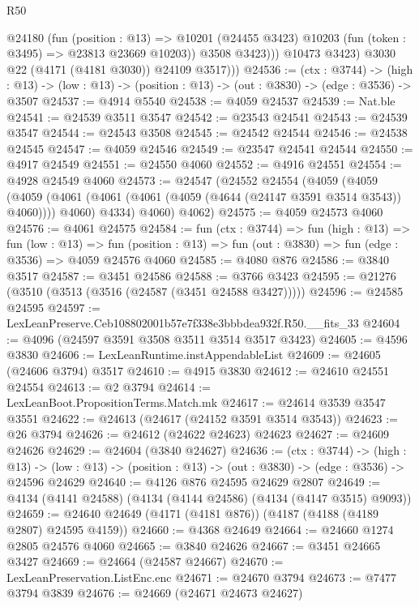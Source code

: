 \begin{lexlean}{R50}
\begin{coremodule}
                @24180
                  (fun (position : @13) =>
                  @10201 (@24455 @3423) @10203 (fun (token : @3495) => @23813 @23669 @10203))
                  @3508
                  @3423)))
            @10473
            @3423)
          @3030
          @22
          (@4171 (@4181 @3030))
          @24109
          @3517)))
@24536 := (ctx : @3744) ->
  (high : @13) -> (low : @13) -> (position : @13) -> (out : @3830) -> (edge : @3536) -> @3507
@24537 := @4914 @5540
@24538 := @4059 @24537
@24539 := Nat.ble
@24541 := @24539 @3511 @3547
@24542 := @23543 @24541
@24543 := @24539 @3547
@24544 := @24543 @3508
@24545 := @24542 @24544
@24546 := @24538 @24545
@24547 := @4059 @24546
@24549 := @23547 @24541 @24544
@24550 := @4917 @24549
@24551 := @24550 @4060
@24552 := @4916 @24551
@24554 := @4928 @24549 @4060
@24573 := @24547
    (@24552
      @24554
      (@4059
        (@4059
          (@4059 (@4061 (@4061 (@4061 (@4059 (@4644 (@24147 @3591 @3514 @3543)) @4060)))) @4060)
          @4334)
        @4060)
      @4062)
@24575 := @4059 @24573 @4060
@24576 := @4061 @24575
@24584 := fun (ctx : @3744) =>
  fun (high : @13) =>
  fun (low : @13) =>
  fun (position : @13) => fun (out : @3830) => fun (edge : @3536) => @4059 @24576 @4060
@24585 := @4080 @876
@24586 := @3840 @3517
@24587 := @3451 @24586
@24588 := @3766 @3423
@24595 := @21276 (@3510 (@3513 (@3516 (@24587 (@3451 @24588 @3427)))))
@24596 := @24585 @24595
@24597 := LexLeanPreserve.Ceb108802001b57e7f338e3bbbdea932f.R50.__fits_33
@24604 := @4096 (@24597 @3591 @3508 @3511 @3514 @3517 @3423)
@24605 := @4596 @3830
@24606 := LexLeanRuntime.instAppendableList
@24609 := @24605 (@24606 @3794) @3517
@24610 := @4915 @3830
@24612 := @24610 @24551 @24554
@24613 := @2 @3794
@24614 := LexLeanBoot.PropositionTerms.Match.mk
@24617 := @24614 @3539 @3547 @3551
@24622 := @24613 (@24617 (@24152 @3591 @3514 @3543))
@24623 := @26 @3794
@24626 := @24612 (@24622 @24623) @24623
@24627 := @24609 @24626
@24629 := @24604 (@3840 @24627)
@24636 := (ctx : @3744) ->
  (high : @13) ->
  (low : @13) -> (position : @13) -> (out : @3830) -> (edge : @3536) -> @24596 @24629
@24640 := @4126 @876 @24595 @24629 @2807
@24649 := @4134 (@4141 @24588) (@4134 (@4144 @24586) (@4134 (@4147 @3515) @9093))
@24659 := @24640 @24649 (@4171 (@4181 @876)) (@4187 (@4188 (@4189 @2807) @24595 @4159))
@24660 := @4368 @24649
@24664 := @24660 @1274 @2805 @24576 @4060
@24665 := @3840 @24626
@24667 := @3451 @24665 @3427
@24669 := @24664 (@24587 @24667)
@24670 := LexLeanPreservation.ListEnc.enc
@24671 := @24670 @3794
@24673 := @7477 @3794 @3839
@24676 := @24669 (@24671 @24673 @24627)

\end{coremodule}
\end{lexlean}
